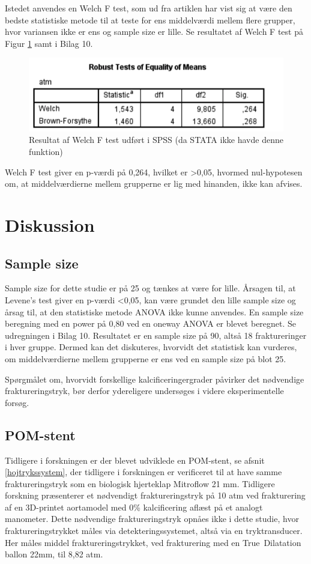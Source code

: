 Istedet anvendes en Welch F test, som ud fra artiklen \cite{welchftest} har vist sig at være den bedste statistiske metode til at teste for ens middelværdi mellem flere grupper, hvor variansen ikke er ens og sample size er lille. Se resultatet af Welch F test på Figur \ref{welchr} samt i Bilag 10.

\begin{figure}[H]
	\centering
	\includegraphics[width=1\textwidth]{Figure/welch}
	\caption{Resultat af Welch F test udført i SPSS (da STATA ikke havde denne funktion)}
	\label{welchr}
\end{figure}

Welch F test giver en p-værdi på 0,264, hvilket er >0,05, hvormed nul-hypotesen om, at middelværdierne mellem grupperne er lig med hinanden, ikke kan afvises. 
  

\section{Diskussion}

\subsection*{Sample size}
Sample size for dette studie er på 25 og tænkes at være for lille. Årsagen til, at Levene's test giver en p-værdi <0,05, kan være grundet den lille sample size og årsag til, at den statistiske metode ANOVA ikke kunne anvendes. En sample size beregning med en power på 0,80 ved en oneway ANOVA er blevet beregnet. Se udregningen i Bilag 10. Resultatet er en sample size på 90, altså 18 fraktureringer i hver gruppe. Dermed kan det diskuteres, hvorvidt det statistisk kan vurderes, om middelværdierne mellem grupperne er ens ved en sample size på blot 25. 

Spørgmålet om, hvorvidt forskellige kalcificeringergrader påvirker det nødvendige fraktureringstryk, bør derfor ydereligere undersøges i videre eksperimentelle forsøg.  

\subsection*{POM-stent}
Tidligere i forskningen er der blevet udviklede en POM-stent, se afsnit \ref{hojtrykssystem}, der tidligere i forskningen \cite{rapport} er verificeret til at have samme fraktureringstryk som en biologisk hjerteklap Mitroflow 21 mm. Tidligere forskning præsenterer et nødvendigt fraktureringstryk på 10 atm ved frakturering af en 3D-printet aortamodel med 0\% kalcificering aflæst på et analogt manometer. Dette nødvendige fraktureringstryk opnåes ikke i dette studie, hvor fraktureringstrykket måles via detekteringssystemet, altså via en tryktransducer. Her måles middel fraktureringstrykket, ved frakturering med en True\texttrademark \ Dilatation ballon 22mm, til 8,82 atm. 

